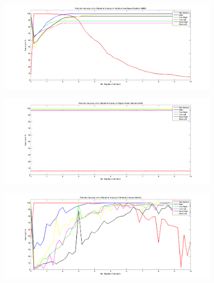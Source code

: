 \begin{figure}
	[h] 	
	\centerline{\includegraphics[width=180mm]{figures/result/test-accuracy-anbc.jpg}}
\end{figure}
\begin{figure}
	[h] 	
	\centerline{\includegraphics[width=180mm]{figures/result/test-accuracy-svm.jpg}}
\end{figure}
\begin{figure}
	[h] 	
	\centerline{\includegraphics[width=180mm]{figures/result/test-accuracy-mindist.jpg}}
\end{figure}
\label{ev:accuracy}

